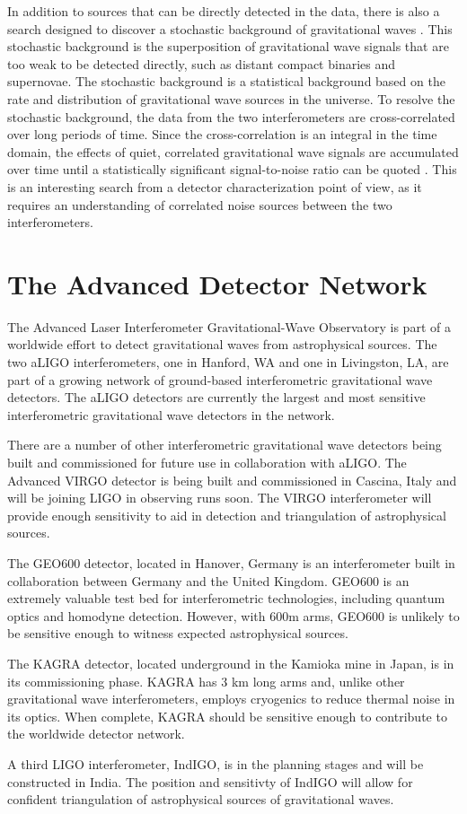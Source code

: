 In addition to sources that can be directly detected in the data, there is 
also a search designed to discover a stochastic background of gravitational waves
 \cite{Collaboration:S4Stochastic,GW150914-STOCHASTIC}. 
This stochastic background is the superposition of gravitational wave signals that 
are too weak to be detected directly, such as distant compact binaries and 
supernovae. The stochastic background is a statistical background based on the 
rate and distribution of gravitational wave sources in the universe. To resolve 
the stochastic background, the data from the two interferometers are 
cross-correlated over long periods of time. Since the cross-correlation 
is an integral in the time domain, the effects of quiet, correlated 
gravitational wave signals are accumulated over time until a statistically 
significant signal-to-noise ratio can be quoted \cite{Allen1999Stoch}. 
This is an interesting search from a detector characterization point of view, 
as it requires an understanding of correlated noise sources between the two 
interferometers. 

\section{The Advanced Detector Network}

The Advanced Laser Interferometer Gravitational-Wave Observatory is 
part of a worldwide effort to detect gravitational waves from astrophysical 
sources. The two aLIGO interferometers, one in Hanford, WA and one in 
Livingston, LA, are part of a growing network of ground-based interferometric 
gravitational wave detectors. The aLIGO detectors are currently the largest 
and most sensitive interferometric gravitational wave detectors in the 
network.

There are a number of other interferometric gravitational wave detectors 
being built and commissioned for future use in collaboration with aLIGO.
The Advanced VIRGO detector is being built and commissioned in Cascina, Italy 
and will be joining LIGO in observing runs soon. 
The VIRGO interferometer will provide enough 
sensitivity to aid in detection and triangulation of astrophysical sources.

The GEO600 detector, located in Hanover, Germany is an interferometer built in 
collaboration between Germany and the United Kingdom. 
GEO600 is an extremely valuable test bed for interferometric technologies,
including quantum optics and homodyne detection. However, with 600m arms, GEO600 
is unlikely to be sensitive enough to witness expected astrophysical sources.

The KAGRA detector, located underground in the Kamioka mine in Japan, 
is in its commissioning phase. KAGRA has 3 km long arms and, 
unlike other gravitational wave interferometers, employs cryogenics to 
reduce thermal noise in its optics. When complete, KAGRA should be 
sensitive enough to contribute to the worldwide detector network.

A third LIGO interferometer, IndIGO, is in the planning stages and will be 
constructed in India. The position and sensitivty of IndIGO will allow for 
confident triangulation of astrophysical sources of gravitational waves.
